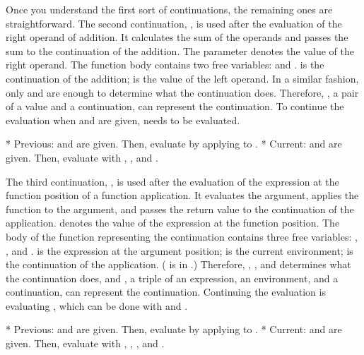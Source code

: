 Once you understand the first sort of continuations, the remaining ones are
straightforward. The second continuation, , is used after the evaluation of the right operand of addition. It
calculates the sum of the operands and passes the sum to the continuation of the
addition. The parameter  denotes the value of the right operand. The
function body contains two free variables:  and .  is
the continuation of the addition;  is the value of the left operand. In
a similar fashion, only  and  are enough to determine what the
continuation does. Therefore, , a pair of a value and a
continuation, can represent the continuation. To continue the evaluation when
 and  are given,  needs
to be evaluated.

* Previous:  and  are given.
Then, evaluate  by applying  to .
* Current:  and  are given. Then, evaluate
 with , , and .

The third continuation, , is
used after the evaluation of the expression at the function position of a
function application. It evaluates the argument, applies the function to the
argument, and passes the return value to the continuation of the application.
 denotes the value of the expression at the function position. The body
of the function representing the continuation contains three free variables:
, , and .  is the expression at the argument
position;  is the current environment;  is the continuation of
the application. ( is in .) Therefore, , ,
and  determines what the continuation does, and , a
triple of an expression, an environment, and a continuation, can represent the
continuation. Continuing the evaluation is evaluating , which can be done with  and .

* Previous:  and 
are given. Then, evaluate  by
applying  to .
* Current:  and  are given. Then, evaluate
 with , ,
, and .

